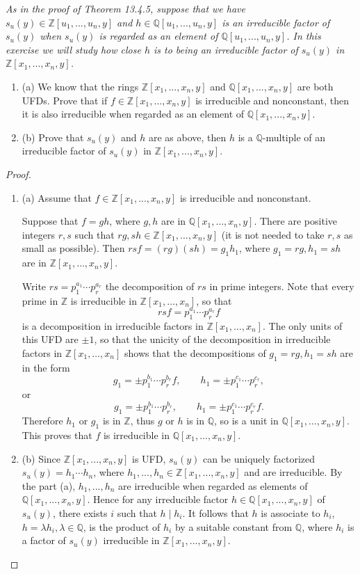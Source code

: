\documentclass[11pt,a4paper]{article}
\newcommand{\be} {\begin{enumerate}}
\newcommand{\ee} {\end{enumerate}}
\newcommand{\Q}{\mathbb{Q}}
\newcommand{\Z}{\mathbb{Z}}
\begin{document}
{\it As in the proof of Theorem 13.4.5, suppose that we have $s_u(y)\in \mathbb{Z}[u_1,...,u_n,y]$ and $h\in \mathbb{Q}[u_1,...,u_n,y]$ is an irreducible factor of $s_u(y)$ when $s_u(y)$ is regarded as an element of $\mathbb{Q}[u_1,...,u_n,y]$. In this exercise we will study how close $h$ is to being an irreducible factor of $s_u(y)$ in $\mathbb{Z}[x_1,...,x_n,y]$.
\be
\item[(a)] We know that the rings $\mathbb{Z}[x_1,...,x_n,y]$ and $\mathbb{Q}[x_1,...,x_n,y]$ are both UFDs. Prove that if $f\in\mathbb{Z}[x_1,...,x_n,y]$ is irreducible and nonconstant, then it is also irreducible when regarded as an element of $\mathbb{Q}[x_1,...,x_n,y]$.
\item[(b)] Prove that $s_u(y)$ and $h$ are as above, then $h$ is a $\mathbb{Q}$-multiple of an irreducible factor of $s_u(y)$ in  $\mathbb{Z}[x_1,...,x_n,y]$. 
\ee
\begin{proof}
\be
\item[(a)] 
Assume that $f\in\mathbb{Z}[x_1,...,x_n,y]$ is irreducible and nonconstant.

 Suppose that $f = g h$, where $g,h$ are in $\Q[x_1,\ldots,x_n,y]$. There are positive integers $r,s$ such that $rg, sh \in \Z[x_1,\ldots,x_n,y]$ (it is not needed to take $r,s$ as small as possible). Then $rs f = (rg)(sh) =g_1 h_1$, where $g_1 = rg, h_1 = sh$ are in $\Z[x_1,\ldots,x_n,y]$.
 
Write $rs = p_1^{a_1}\cdots p_r^{a_r}$ the decomposition of $rs$ in prime integers. Note that every prime in $\Z$ is irreducible in $\Z[x_1,\ldots,x_n]$, so that 
$$rs f = p_1^{a_1}\cdots p_r^{a_r}f$$
is a decomposition in irreducible factors in $\Z[x_1,\ldots,x_n]$. The only units of this UFD are $\pm 1$, so that the unicity of the decomposition in irreducible factors in $\Z[x_1,\ldots,x_n]$ shows that the decompositions of $g_1=rg,h_1=sh$ are in the form
$$ g_1 = \pm p_1^{b_1}\cdots p_r^{b_r} f,\qquad  h_1 = \pm  p_1^{c_1}\cdots p_r^{c_r},$$
or
$$ g_1 = \pm p_1^{b_1}\cdots p_r^{b_r} ,\qquad h_1 = \pm  p_1^{c_1}\cdots p_r^{c_r} f.$$
Therefore $h_1$ or $g_1$ is in $\Z$, thus $g$ or $h$ is in $\Q$, so is a unit in $\Q[x_1,\ldots,x_n,y]$. This proves that $f$ is irreducible in $\Q[x_1,\ldots,x_n,y]$.


\item[(b)] Since $\mathbb{Z}[x_1,...,x_n,y]$ is UFD, $s_u(y)$ can be uniquely factorized $s_u(y)=h_1\cdots h_n$, where $h_1,...,h_n\in\mathbb{Z}[x_1,...,x_n,y]$ and are irreducible. By the part (a), $h_1,...,h_n$ are irreducible when regarded as elements of $\mathbb{Q}[x_1,...,x_n,y]$. Hence for any  irreducible factor $h\in\mathbb{Q}[x_1,...,x_n,y]$  of $s_u(y)$, there exists $i$ such that $h\mid h_i$. It follows that $h$ is associate to $h_i$, $h=\lambda h_i, \lambda \in \Q$, is the product of $h_i$ by a suitable constant from $\mathbb{Q}$, where $h_i$ is a factor of $s_u(y)$ irreducible in $\mathbb{Z}[x_1,...,x_n,y]$.
\ee
\end{proof}
}
\end{document}
